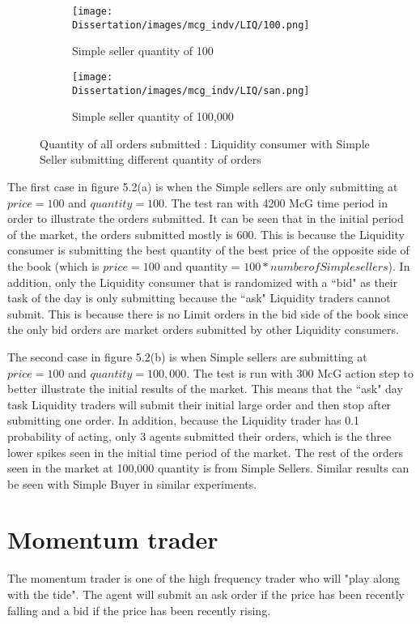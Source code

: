 \begin{figure}[h]
  \begin{subfigure}[b]{0.5\textwidth}
    \texttt{[image: Dissertation/images/mcg\_indv/LIQ/100.png]}
    \caption{Simple seller quantity of 100}
    \label{fig:1}
  \end{subfigure}
  \begin{subfigure}[b]{0.5\textwidth}
    \texttt{[image: Dissertation/images/mcg\_indv/LIQ/san.png]}
    \caption{Simple seller quantity of 100,000}
    \label{fig:2}
  \end{subfigure}
\caption{Quantity of all orders submitted : Liquidity consumer with Simple Seller submitting different quantity of orders} 
\end{figure}

The first case in figure 5.2(a) is when the Simple sellers are only submitting at $price = 100$ and $quantity = 100$. The test ran with 4200 McG time period in order to illustrate the orders submitted. It can be seen that in the initial period of the market, the orders submitted mostly is 600. This is because the Liquidity consumer is submitting the best quantity of the best price of the opposite side of the book (which is $price = 100$ and quantity = $ 100 * number of Simple sellers$). In addition, only the Liquidity consumer that is randomized with a ``bid" as their task of the day is only submitting because the ``ask" Liquidity traders cannot submit. This is because there is no Limit orders in the bid side of the book since the only bid orders are market orders submitted by other Liquidity consumers.

The second case in figure 5.2(b) is when Simple sellers are submitting at $price = 100$ and $quantity = 100,000$. The test is run with 300 McG action step to better illustrate the initial results of the market. This means that the ``ask" day task Liquidity traders will submit their initial large order and then stop after submitting one order. In addition, because the Liquidity trader has 0.1 probability of acting, only 3 agents submitted their orders, which is the three lower spikes seen in the initial time period of the market. The rest of the orders seen in the market at 100,000 quantity is from Simple Sellers. Similar results can be seen with Simple Buyer in similar experiments. 

\section{Momentum trader}
The momentum trader is one of the high frequency trader who will "play along with the tide". The agent will submit an ask order if the price has been recently falling and a bid if the price has been recently rising. 

